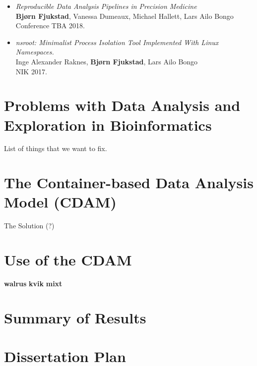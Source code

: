 \begin{itemize}
    \item \emph{Reproducible Data Analysis Pipelines in Precision Medicine}
        \\
        \textbf{Bjørn Fjukstad}, Vanessa Dumeaux, Michael Hallett, Lars Ailo
        Bongo
        \\
        Conference TBA 2018. 


    \item \emph{nsroot: Minimalist Process Isolation Tool Implemented With Linux
        Namespaces.}
        \\
        Inge Alexander Raknes, \textbf{Bjørn Fjukstad}, Lars Ailo Bongo 
        \\
        NIK 2017. 
        
\end{itemize} 

\section{Problems with Data Analysis and Exploration in Bioinformatics} 
    List of things that we want to fix. 

\section{The Container-based Data Analysis Model (CDAM)} 
    The Solution (?) 

\section{Use of the CDAM} 

\textbf{walrus}
\textbf{kvik} 
\textbf{mixt} 

\section{Summary of Results} 

\section{Dissertation Plan} 


